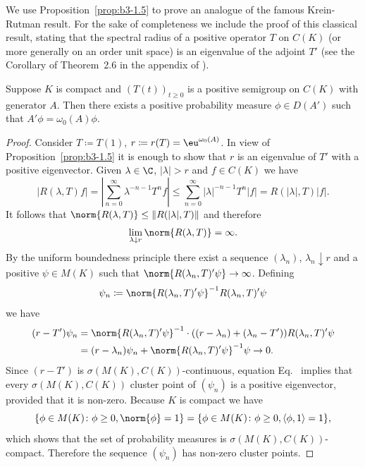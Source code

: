 We use Proposition~\ref{prop:b3-1.5} to prove an analogue of the famous Krein-Rutman result.
For the sake of completeness we include the proof of this classical result, stating that the spectral radius of a positive operator $T$ on $C(K)$ (or more generally on an order unit space) is an eigenvalue of the adjoint $T'$ (see the Corollary of Theorem~2.6 in the appendix of \textcite{schaefer:1966}).
\begin{theorem}\label{thm:b3-1.6}
	Suppose $K$ is compact and $(T(t))_{t \geq 0}$ is a positive semigroup on $C(K)$ with generator $A$.
	Then there exists a positive probability measure $\phi \in D(A')$ such that $A'\phi = \omega_{0}(A)\phi$.
\end{theorem}
\begin{proof}
	Consider $T \coloneqq T(1)$, $r \coloneqq r(T) = \eu^{\omega_{0}(A)}$.
	In view of Proposition~\ref{prop:b3-1.5} it is enough to show that $r$ is an eigenvalue of\/ $T'$ with a positive eigenvector.
	Given $\lambda \in \C$, $|\lambda| > r$ and $f \in C(K)$ we have
	\[
	|R(\lambda,T)f| = \left|\sum_{n=0}^{\infty} \lambda^{-n-1} T^{n}f\right| \leq \sum_{n=0}^{\infty} |\lambda|^{-n-1} T^{n}|f| = R(|\lambda|,T) |f|.
	\]
	It follows that $\norm{R(\lambda,T)} \leq \|R(|\lambda|,T)\|$ and therefore
	\begin{equation}\label{eq:b3-1.15}
		\lim_{\lambda \downarrow r}\norm{R(\lambda,T)} = \infty.
	\end{equation}
	By the uniform boundedness principle there exist a sequence $(\lambda_{n})$, $\lambda_{n} \downarrow r$ and a positive $\psi \in M(K)$ such that $\norm{R(\lambda_{n},T)'\psi} \to \infty$.
	Defining 
    \[
    \psi_{n} \coloneqq \norm{R(\lambda_{n},T)'\psi}^{-1}R(\lambda_{n},T)'\psi
    \] we have
	\begin{equation}\label{eq:b3-1.16}
		\begin{split}
		(r - T')\psi_{n} & = \norm{R(\lambda_{n},T)'\psi}^{-1}\cdot((r-\lambda_{n}) + (\lambda_{n} - T'))R(\lambda_{n},T)'\psi\\ 
		& = (r-\lambda_{n})\psi_{n} + \norm{R(\lambda_{n},T)'\psi}^{-1}\psi \to 0.
		\end{split}
	\end{equation}
	Since $(r - T')$ is $\sigma(M(K),C(K))$-continuous, equation Eq.~ implies that every $\sigma(M(K),C(K))$ cluster point of\/ $(\psi_{n})$ is a positive eigenvector, provided that it is non-zero.
	Because $K$ is compact we have 
%
\[
	\{\phi \in M(K) \colon \phi \geq 0, \norm{\phi} = 1\} 
	= \{\phi \in M(K) \colon \phi \geq 0, \langle \phi,1 \rangle = 1\} , 
\]
which shows that the set of probability measures is $\sigma(M(K),C(K))$-compact.
	Therefore the sequence $(\psi_{n})$ has non-zero cluster points.
\end{proof}

